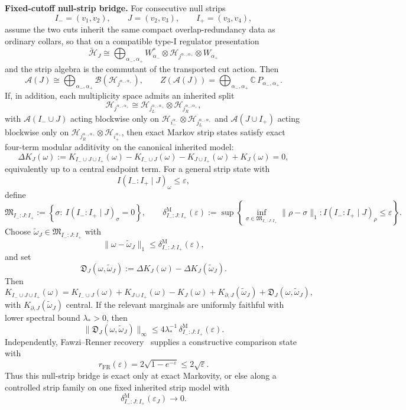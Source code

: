 \textbf{Fixed-cutoff null-strip bridge.} For consecutive null strips
\[
I_-=(v_1,v_2),\qquad
J=(v_2,v_3),\qquad
I_+=(v_3,v_4),
\]
assume the two cuts inherit the same compact overlap-redundancy data as ordinary collars, so that on a compatible type-I regulator presentation
\[
\tilde{\mathcal H}_{J}
\cong
\bigoplus_{\alpha_-,\alpha_+}
W_{\alpha_-}^{*}\otimes
\mathcal H_{j^{\alpha_-,\alpha_+}}\otimes
W_{\alpha_+}
\]
and the strip algebra is the commutant of the transported cut action. Then
\[
\mathcal A(J)
\cong
\bigoplus_{\alpha_-,\alpha_+}
\mathcal B(\mathcal H_{j^{\alpha_-,\alpha_+}}),
\qquad
Z(\mathcal A(J))
=
\bigoplus_{\alpha_-,\alpha_+}\mathbb C\,P_{\alpha_-,\alpha_+}.
\]
If, in addition, each multiplicity space admits an inherited split
\[
\mathcal H_{j^{\alpha_-,\alpha_+}}
\cong
\mathcal H_{j_L^{\alpha_-,\alpha_+}}
\otimes
\mathcal H_{j_R^{\alpha_-,\alpha_+}},
\]
with \(\mathcal A(I_-\cup J)\) acting blockwise only on
\(\mathcal H_{i_-^{\alpha_-}}\otimes \mathcal H_{j_L^{\alpha_-,\alpha_+}}\)
and \(\mathcal A(J\cup I_+)\) acting blockwise only on
\(\mathcal H_{j_R^{\alpha_-,\alpha_+}}\otimes \mathcal H_{i_+^{\alpha_+}}\),
then exact Markov strip states satisfy exact four-term modular additivity on the canonical inherited model:
\[
\Delta K_J(\omega)
:=
K_{I_-\cup J\cup I_+}(\omega)-K_{I_-\cup J}(\omega)-K_{J\cup I_+}(\omega)+K_J(\omega)
=0,
\]
equivalently up to a central endpoint term. For a general strip state with
\[
I(I_-:I_+\mid J)_\omega\le \varepsilon,
\]
define
\[
\mathfrak M_{I_-:J:I_+}
:=
\left\{
\sigma:\ I(I_-:I_+\mid J)_\sigma=0
\right\},
\qquad
\delta^{\mathrm M}_{I_-:J:I_+}(\varepsilon)
:=
\sup\left\{
\inf_{\sigma\in\mathfrak M_{I_-:J:I_+}}\|\rho-\sigma\|_1:
I(I_-:I_+\mid J)_\rho\le\varepsilon
\right\}.
\]
Choose \(\widetilde\omega_J\in \mathfrak M_{I_-:J:I_+}\) with
\[
\|\omega-\widetilde\omega_J\|_1
\le
\delta^{\mathrm M}_{I_-:J:I_+}(\varepsilon),
\]
and set
\[
\mathfrak D_J(\omega,\widetilde\omega_J)
:=
\Delta K_J(\omega)-\Delta K_J(\widetilde\omega_J).
\]
Then
\[
K_{I_-\cup J\cup I_+}(\omega)
=
K_{I_-\cup J}(\omega)+K_{J\cup I_+}(\omega)-K_J(\omega)
+K_{\partial,J}(\widetilde\omega_J)
+\mathfrak D_J(\omega,\widetilde\omega_J),
\]
with \(K_{\partial,J}(\widetilde\omega_J)\) central. If the relevant marginals are uniformly faithful with lower spectral bound \(\lambda_\ast>0\), then
\[
\|\mathfrak D_J(\omega,\widetilde\omega_J)\|_\infty
\le
4\lambda_\ast^{-1}\,
\delta^{\mathrm M}_{I_-:J:I_+}(\varepsilon).
\]
Independently, Fawzi--Renner recovery~\cite{fawziRenner15} supplies a constructive comparison state with
\[
r_{\mathrm{FR}}(\varepsilon)
=
2\sqrt{1-e^{-\varepsilon}}
\le
2\sqrt{\varepsilon}.
\]
Thus this null-strip bridge is exact only at exact Markovity, or else along a controlled strip family on one fixed inherited strip model with
\[
\delta^{\mathrm M}_{I_-:J:I_+}(\varepsilon_J)\to 0.
\]

